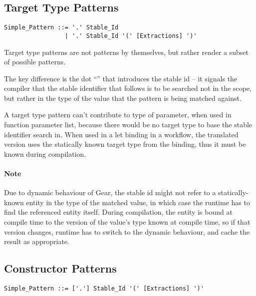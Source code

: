\subsection{Target Type Patterns}
\label{sec:target-type-patterns}

\syntax\begin{lstlisting}
Simple_Pattern ::= '.' Stable_Id
                 | '.' Stable_Id '(' [Extractions] ')'
\end{lstlisting}

Target type patterns are not patterns by themselves, but rather render a subset of possible patterns. 

The key difference is the dot ``'' that introduces the stable id -- it signals the compiler that the stable identifier that follows is to be searched not in the scope, but rather in the type of the value that the pattern is being matched against. 

A target type pattern can't contribute to type of parameter, when used in function parameter list, because there would be no target type to base the stable identifier search in. When used in a let binding in a workflow, the translated version uses the statically known target type from the binding, thus it must be known during compilation. 

\paragraph{Note}
Due to dynamic behaviour of Gear, the stable id might not refer to a statically-known entity in the type of the matched value, in which case the runtime has to find the referenced entity itself. During compilation, the entity is bound at compile time to the version of the value's type known at compile time, so if that version changes, runtime has to switch to the dynamic behaviour, and cache the result as appropriate. 





\subsection{Constructor Patterns}
\label{sec:constructor-patterns}

\syntax\begin{lstlisting}
Simple_Pattern ::= ['.'] Stable_Id '(' [Extractions] ')'
\end{lstlisting}

